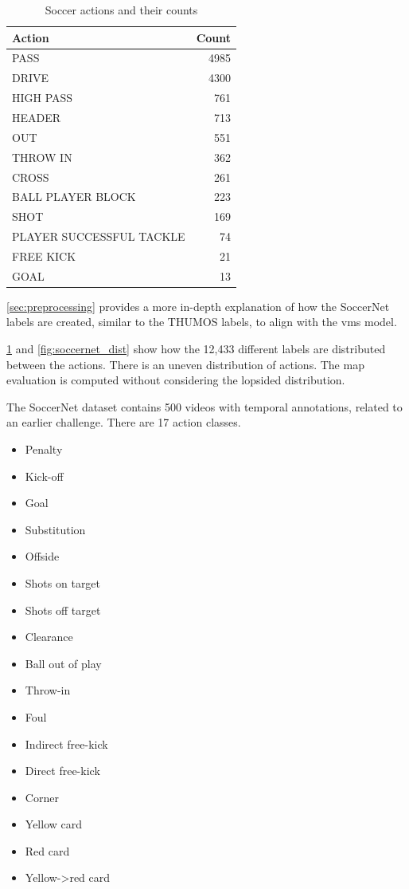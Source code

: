 \begin{table}
    \centering
    \begin{tabular}{lr}
        \toprule
        Action                    & Count \\
        \midrule
        PASS                      & 4985  \\
        DRIVE                     & 4300  \\
        HIGH PASS                 & 761   \\
        HEADER                    & 713   \\
        OUT                       & 551   \\
        THROW IN                  & 362   \\
        CROSS                     & 261   \\
        BALL PLAYER BLOCK         & 223   \\
        SHOT                      & 169   \\
        PLAYER SUCCESSFUL TACKLE  & 74    \\
        FREE KICK                 & 21    \\
        GOAL                      & 13    \\
        \bottomrule
    \end{tabular}
    \caption{Soccer actions and their counts}
    \label{tab:soccer_actions}
\end{table}

\cref{sec:preprocessing} provides a more in-depth explanation of how the SoccerNet labels are created, similar to the THUMOS labels, to align with the \acrshort{vms} model. 

\cref{tab:soccer_actions} and \cref{fig:soccernet_dist} show how the 12,433 different labels are distributed between the actions. There is an uneven distribution of actions. The \acrshort{map} evaluation is computed without considering the lopsided distribution.

The SoccerNet dataset contains 500 videos with temporal annotations, related to an earlier challenge. There are 17 action classes.
\begin{itemize}
    \item Penalty
    \item Kick-off
    \item Goal
    \item Substitution
    \item Offside
    \item Shots on target
    \item Shots off target
    \item Clearance
    \item Ball out of play
    \item Throw-in
    \item Foul
    \item Indirect free-kick
    \item Direct free-kick
    \item Corner
    \item Yellow card
    \item Red card
    \item Yellow->red card
\end{itemize}

